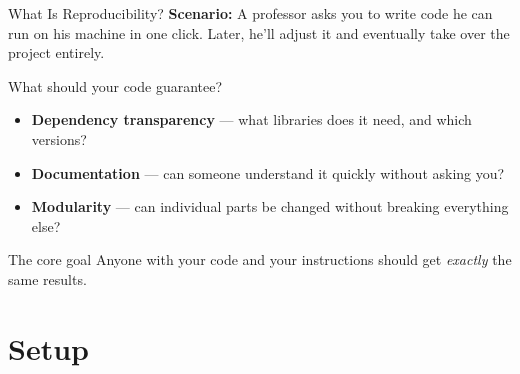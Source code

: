 \documentclass[13pt, aspectratio=169]{beamer}
\begin{document}
\begin{frame}{What Is Reproducibility?}
    \textbf{Scenario:} A professor asks you to write code he can run on his machine in one click. Later, he'll adjust it and eventually take over the project entirely.

    \vspace{0.5em}
    What should your code guarantee?

    \begin{itemize}
        \item \textbf{Dependency transparency} — what libraries does it need, and which versions?
        \item \textbf{Documentation} — can someone understand it quickly without asking you?
        \item \textbf{Modularity} — can individual parts be changed without breaking everything else?
    \end{itemize}

    \vspace{0.4em}
    \begin{alertblock}{The core goal}
        Anyone with your code and your instructions should get \textit{exactly} the same results.
    \end{alertblock}
\end{frame}

\section{Setup}
\end{document}
